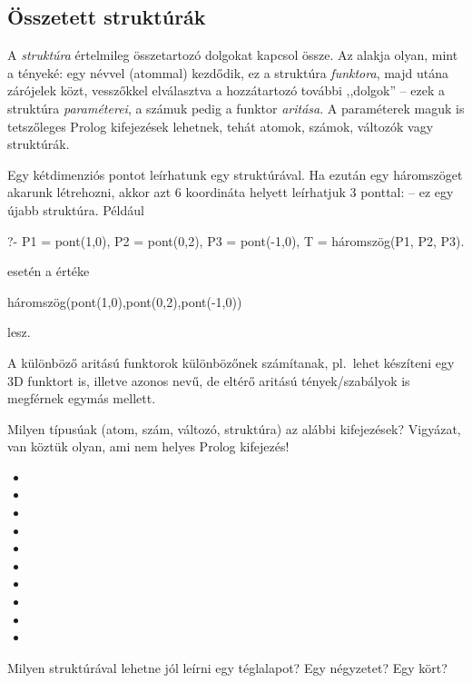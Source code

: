 \subsection*{Összetett struktúrák}
A \emph{struktúra} értelmileg összetartozó dolgokat
kapcsol össze. Az alakja olyan, mint a tényeké: egy
névvel (atommal) kezdődik, ez a struktúra
\emph{funktora}, majd utána zárójelek közt,
vesszőkkel elválasztva a hozzátartozó további
,,dolgok'' -- ezek a struktúra \emph{paraméterei}, a
számuk pedig a funktor \emph{aritása}.
A paraméterek maguk is tetszőleges Prolog
kifejezések lehetnek, tehát atomok, számok, változók
vagy struktúrák.

Egy kétdimenziós pontot leírhatunk egy
 struktúrával. Ha ezután egy
háromszöget akarunk létrehozni, akkor azt 6
koordináta helyett leírhatjuk 3 ponttal:
 -- ez egy újabb
struktúra. Például
\begin{query}
?- P1 = pont(1,0), P2 = pont(0,2), P3 = pont(-1,0),
   T = háromszög(P1, P2, P3).
\end{query}
esetén a  értéke
\begin{query}
háromszög(pont(1,0),pont(0,2),pont(-1,0))
\end{query}
lesz.

A különböző aritású funktorok különbözőnek
számítanak, pl.~lehet készíteni egy 3D
 funktort is, illetve azonos nevű,
de eltérő aritású tények/szabályok is megférnek
egymás mellett.

\begin{problem}
Milyen típusúak (atom, szám, változó, struktúra) az
alábbi kifejezések? Vigyázat, van köztük olyan, ami
nem helyes Prolog kifejezés!
\begin{itemize}
\item {}
\item {}
\item {}
\item {}
\item {}
\item {}
\item {}
\item {}
\item {}
\item {}
\end{itemize}
\end{problem}
\begin{problem}
Milyen struktúrával lehetne jól leírni egy
téglalapot? Egy négyzetet? Egy kört?
\end{problem}

